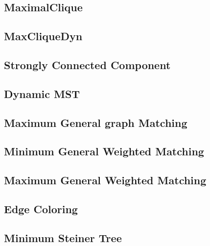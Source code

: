 \documentclass[a4paper,10pt,twocolumn,oneside]{article}
\begin{document}
\subsection{MaximalClique}


\subsection{MaxCliqueDyn}


%

\subsection{Strongly Connected Component}


\subsection{Dynamic MST}


\subsection{Maximum General graph Matching}


\subsection{Minimum General Weighted Matching}


\subsection{Maximum General Weighted Matching}


\subsection{Edge Coloring}


\subsection{Minimum Steiner Tree}

\end{document}
